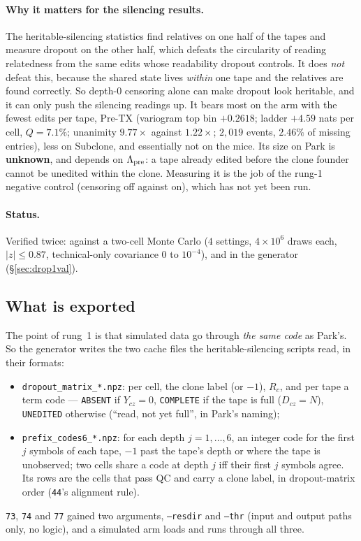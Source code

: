 \paragraph{Why it matters for the silencing results.} The heritable-silencing statistics find
relatives on one half of the tapes and measure dropout on the other half, which defeats the
circularity of reading relatedness from the same edits whose readability dropout controls. It does
\emph{not} defeat this, because the shared state lives \emph{within} one tape and the relatives are
found correctly. So depth-0 censoring alone can make dropout look heritable, and it can only push the
silencing readings up. It bears most on the arm with the fewest edits per tape, Pre-TX (variogram
top bin $+0.2618$; ladder $+4.59$ nats per cell, $Q=7.1\%$; unanimity $9.77\times$ against $1.22\times$;
$2{,}019$ events, $2.46\%$ of missing entries), less on Subclone, and essentially not on the mice. Its
size on Park is \textbf{unknown}, and depends on $\Lambda_{\rm pre}$: a tape already edited before the
clone founder cannot be unedited within the clone. Measuring it is the job of the rung-1 negative
control (censoring off against on), which has not yet been run.

\paragraph{Status.} Verified twice: against a two-cell Monte Carlo ($4$ settings, $4\times10^6$ draws
each, $|z|\le0.87$, technical-only covariance $0$ to $10^{-4}$), and in the generator
(\S\ref{sec:drop1val}).

\subsection{What is exported}\label{sec:export}

The point of rung~1 is that simulated data go through \emph{the same code} as Park's. So the
generator writes the two cache files the heritable-silencing scripts read, in their formats:
\begin{itemize}
  \item \texttt{dropout\_matrix\_*.npz}: per cell, the clone label (or $-1$), $R_c$, and per tape a
        term code --- \texttt{ABSENT} if $Y_{cz}=0$, \texttt{COMPLETE} if the tape is full
        ($D_{cz}=N$), \texttt{UNEDITED} otherwise (``read, not yet full'', in Park's naming);
  \item \texttt{prefix\_codes6\_*.npz}: for each depth $j=1,\dots,6$, an integer code for the first
        $j$ symbols of each tape, $-1$ past the tape's depth or where the tape is unobserved; two cells
        share a code at depth $j$ iff their first $j$ symbols agree. Its rows are the cells that pass
        QC and carry a clone label, in dropout-matrix order (\texttt{44}'s alignment rule).
\end{itemize}
\texttt{73}, \texttt{74} and \texttt{77} gained two arguments, \texttt{--resdir} and \texttt{--thr}
(input and output paths only, no logic), and a simulated arm loads and runs through all three.

